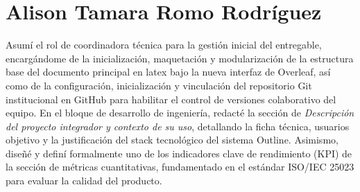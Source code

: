 \documentclass{report}
\begin{document}
\section*{Alison Tamara Romo Rodríguez}
Asumí el rol de coordinadora técnica para la gestión inicial del entregable, encargándome de la inicialización, maquetación y modularización de la estructura base del documento principal en latex bajo la nueva interfaz de Overleaf, así como de la configuración, inicialización y vinculación del repositorio Git institucional en GitHub para habilitar el control de versiones colaborativo del equipo. En el bloque de desarrollo de ingeniería, redacté la sección de \textit{Descripción del proyecto integrador y contexto de su uso}, detallando la ficha técnica, usuarios objetivo y la justificación del stack tecnológico del sistema Outline. Asimismo, diseñé y definí formalmente uno de los indicadores clave de rendimiento (KPI) de la sección de métricas cuantitativas, fundamentado en el estándar ISO/IEC 25023 para evaluar la calidad del producto.

\printbibliography
\end{document}
